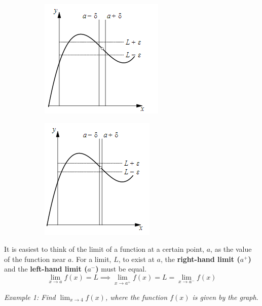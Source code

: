         \begin{figure} [hbt!]
            \centering
            \begin{subfigure}[b]{.45\textwidth}
                \includegraphics{Resources/Unit1Limits/limit1.PNG}
            \end{subfigure}
            \begin{subfigure}[b]{.45\textwidth}
                \includegraphics{Resources/Unit1Limits/limit2.PNG}
            \end{subfigure}
        \end{figure}

        \noindent It is easiest to think of the limit of a function at a certain point, $a$,
        as the value of the function near $a$. For a limit, $L$, to exist at $a$, the
        \textbf{right-hand limit ($a^+$)} and the \textbf{left-hand limit ($a^-$)} must be equal. \\

        \begin{equation*}
            \lim_{x \to a} f(x) = L \implies \lim_{x \to a^+} f(x) = L = \lim_{x \to a^-} f(x)
        \end{equation*}

        \noindent \color{blue} \textit{Example 1: Find $\lim_{x\to 4}f(x)$, where the function
        $f(x)$ is given by the graph}. \color{black} \\


